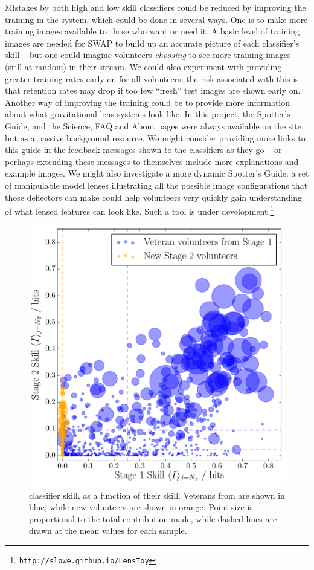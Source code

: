 \documentclass[useAMS,usenatbib,a4paper]{mn2e}
\begin{document}
Mistakes by both high and low skill classifiers could be reduced by improving
the training in the system, which could be done in several ways. One is to make
more training images available to those who want or need it. A basic level of
training images are needed for SWAP to build up an accurate picture of each
classifier's skill -- but one could imagine volunteers {\it choosing} to see
more training images (still at random) in their stream. We could also experiment
with providing greater training rates early on for all volunteers; the risk
associated with this is that retention rates may drop if too few ``fresh'' test
images are shown early on. Another way of improving the training could be to
provide more information about what gravitational lens systems look like. In
this project, the Spotter's Guide, and the Science, FAQ and About pages were
always available on the site, but as a passive background resource. We might
consider providing more links to this guide in the feedback messages shown to
the classifiers as they go -- or perhaps extending these messages to themselves
include more explanations and example images. We might also investigate a more
dynamic Spotter's Guide: a set of manipulable model lenses illustrating all the
possible image configurations that those deflectors can make could help
volunteers very quickly gain understanding of what lensed features can look
like. Such a tool is under development.\footnote{\texttt{http://slowe.github.io/LensToy}}

\begin{figure}
\centering\includegraphics[width=0.9\linewidth]{stage2_veteran_contribution.pdf}
\caption{\StageTwo classifier skill, as a function of their \StageOne skill.
Veterans from \StageOne  are shown in blue, while new volunteers are shown in
orange. Point size is proportional to the total contribution made,
while dashed lines are drawn at the mean values for each sample.}
\label{fig:discuss:performance:stage1vstage2}
\end{figure}
\end{document}
